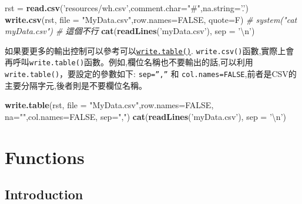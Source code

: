 \documentclass[]{book}
\newenvironment{Shaded}{\begin{snugshade}}{\end{snugshade}}
\newcommand{\CharTok}[1]{\textcolor[rgb]{0.31,0.60,0.02}{#1}}
\newcommand{\CommentTok}[1]{\textcolor[rgb]{0.56,0.35,0.01}{\textit{#1}}}
\newcommand{\DataTypeTok}[1]{\textcolor[rgb]{0.13,0.29,0.53}{#1}}
\newcommand{\KeywordTok}[1]{\textcolor[rgb]{0.13,0.29,0.53}{\textbf{#1}}}
\newcommand{\NormalTok}[1]{#1}
\newcommand{\OtherTok}[1]{\textcolor[rgb]{0.56,0.35,0.01}{#1}}
\newcommand{\StringTok}[1]{\textcolor[rgb]{0.31,0.60,0.02}{#1}}
\theoremstyle{definition}
\theoremstyle{definition}
\theoremstyle{definition}
\theoremstyle{remark}
\begin{document}
\begin{Shaded}
\begin{Highlighting}[]
\NormalTok{rst =}\StringTok{ }\KeywordTok{read.csv}\NormalTok{(}\StringTok{'resources/wh.csv'}\NormalTok{,}\DataTypeTok{comment.char=}\StringTok{"#"}\NormalTok{,}\DataTypeTok{na.string=}\StringTok{'.'}\NormalTok{)}
\KeywordTok{write.csv}\NormalTok{(rst, }\DataTypeTok{file =} \StringTok{"MyData.csv"}\NormalTok{,}\DataTypeTok{row.names=}\OtherTok{FALSE}\NormalTok{, }\DataTypeTok{quote=}\NormalTok{F)}
\CommentTok{# system("cat myData.csv") # 這個不行}
\KeywordTok{cat}\NormalTok{(}\KeywordTok{readLines}\NormalTok{(}\StringTok{'myData.csv'}\NormalTok{), }\DataTypeTok{sep =} \StringTok{'}\CharTok{\textbackslash{}n}\StringTok{'}\NormalTok{)}
\end{Highlighting}
\end{Shaded}

如果要更多的輸出控制可以參考可以\href{http://stat.ethz.ch/R-manual/R-devel/library/utils/html/write.table.html}{\texttt{write.table()}}.
\texttt{write.csv()}函數,實際上會再呼叫\texttt{write.table()}函數。例如,欄位名稱也不要輸出的話,可以利用\texttt{write.table()}，要設定的參數如下:
\texttt{sep=”,”} 和
\texttt{col.names=FALSE},前者是CSV的主要分隔字元,後者則是不要欄位名稱。

\begin{Shaded}
\begin{Highlighting}[]
\KeywordTok{write.table}\NormalTok{(rst, }\DataTypeTok{file =} \StringTok{"MyData.csv"}\NormalTok{,}\DataTypeTok{row.names=}\OtherTok{FALSE}\NormalTok{, }\DataTypeTok{na=}\StringTok{""}\NormalTok{,}\DataTypeTok{col.names=}\OtherTok{FALSE}\NormalTok{, }\DataTypeTok{sep=}\StringTok{","}\NormalTok{)}
\KeywordTok{cat}\NormalTok{(}\KeywordTok{readLines}\NormalTok{(}\StringTok{'myData.csv'}\NormalTok{), }\DataTypeTok{sep =} \StringTok{'}\CharTok{\textbackslash{}n}\StringTok{'}\NormalTok{)}
\end{Highlighting}
\end{Shaded}

\hypertarget{functions}{%
\chapter{Functions}\label{functions}}

\hypertarget{introduction}{%
\section{Introduction}\label{introduction}}
\end{document}
